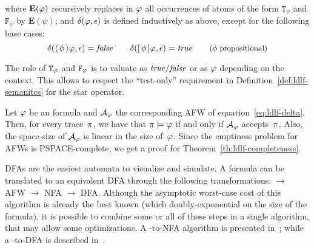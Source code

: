 \endgroup
where $\mathbf{E}(\varphi)$ recursively replaces in $\varphi$ all
occurrences of atoms of the form $\mathtt{T}_\psi$ and $\mathtt{F}_\psi$ by
$\mathbf{E}(\psi)$; and $\delta(\varphi, \epsilon)$ is defined inductively as
above, except for the following base cases:
\begin{equation*}
	\delta(\langle\, {\phi} \,\rangle\varphi, \epsilon) = \text{\textit{false}} \qquad
	\delta([\, {\phi} \,]\varphi, \epsilon) = \text{\textit{true}} \qquad
	\text{\small ($\phi$ propositional)}
\end{equation*}

The role of $\mathtt{T}_\varphi$ and $\mathtt{F}_\varphi$ is to valuate as
$\text{\textit{true}}/\text{\textit{false}}$ or as $\varphi$ depending on the context. This allows to
respect the ``test-only'' requirement in Definition~\ref{def:ldlf-semanitcs}
for the star operator.

Let $\varphi$ be an \ldl{} formula and $\mathcal{A}_\varphi$ the corresponding
AFW of equation~\ref{eq:ldlf-delta}. Then, for every trace~$\pi$, we have
that $\pi \models \varphi$ if and only if $\mathcal{A}_\varphi$
accepts~$\pi$. Also, the space-size of $\mathcal{A}_\varphi$ is linear in the
size of~$\varphi$. Since the emptiness problem for AFWs is PSPACE-complete,
we get a proof for Theorem~\vref{th:ldlf-completeness}.

DFAs are the easiest automata to visualize and simulate. A \ldl{} formula can
be translated to an equivalent DFA through the following transformations:
\ldl{} $\to$ AFW $\to$ NFA $\to$ DFA. Although the asymptotic worst-case cost
of this algorithm is already the best known (which doubly-exponential on the
size of the formula), it is possible to combine some or all of these steps in
a single algorithm, that may allow some optimizations. A \ldl{}-to-NFA
algorithm is presented in~\cite{bib:degiacomo-logic-nmrdp}; while a
\ldl{}-to-DFA is described in~\cite{bib:favorito-thesis}.
